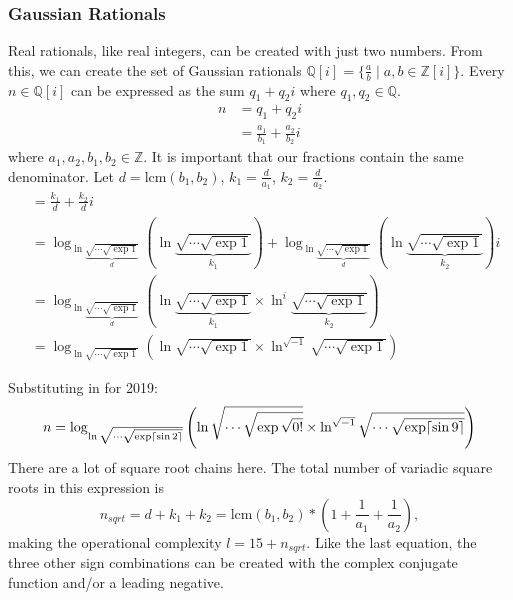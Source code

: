 \subsubsection{Gaussian Rationals}
Real rationals, like real integers, can be created with just two numbers.
From this, we can create the set of Gaussian rationals $\mathbb{Q}[i]=\{\frac{a}{b}\mid a,b\in\mathbb{Z}[i]\}$.
Every $n\in\mathbb{Q}[i]$ can be expressed as the sum $q_1+q_2i$ where $q_1,q_2\in\mathbb{Q}$.
\begin{align*}
  n &= q_1+q_2i \\
  &= \frac{a_1}{b_1} + \frac{a_2}{b_2}i
\end{align*}
where $a_1, a_2, b_1, b_2\in\mathbb{Z}$.
It is important that our fractions contain the same denominator.
Let $d=\textrm{lcm}(b_1, b_2)$, $k_1=\frac{d}{a_1}$, $k_2=\frac{d}{a_2}$.
\begin{align*}
  &= \frac{k_1}{d} + \frac{k_2}{d}i \\
  &= \log_{
      \ln \underbrace{\sqrt{\cdots\sqrt{\exp1}}}_{d}
    }
    \left(
      \ln \underbrace{\sqrt{\cdots\sqrt{\exp1}}}_{k_1}
    \right) +
    \log_{
      \ln \underbrace{\sqrt{\cdots\sqrt{\exp1}}}_{d}
    }
    \left(
      \ln \underbrace{\sqrt{\cdots\sqrt{\exp1}}}_{k_2}
    \right)i \\
  &= \log_{
      \ln \underbrace{\sqrt{\cdots\sqrt{\exp1}}}_{d}
    }
    \left(
      \ln \underbrace{\sqrt{\cdots\sqrt{\exp1}}}_{k_1}
      \times
      \ln^{i} \underbrace{\sqrt{\cdots\sqrt{\exp1}}}_{k_2}
    \right) \\
  &= \log_{\ln \sqrt{\cdots\sqrt{\exp1}}}
    \left(
      \ln \sqrt{\cdots\sqrt{\exp1}}
      \times
      \ln^{\sqrt{-1}} \sqrt{\cdots\sqrt{\exp1}}
    \right)
\end{align*}

Substituting in for 2019:
\begin{equation}
  n = \log_{\ln \sqrt{\cdots\sqrt{\exp\ceil{\sin2}}}}
    \left(
      \ln \sqrt{\cdots\sqrt{\exp\sqrt{0!}}}
      \times
      \ln^{\sqrt{-1}} \sqrt{\cdots\sqrt{\exp\ceil{\sin9}}}
    \right)
\end{equation}
There are a lot of square root chains here.
The total number of variadic square roots in this expression is
\begin{equation*}
  n_{sqrt}=d+k_1+k_2=\textrm{lcm}(b_1,b_2) * \left(1+\frac{1}{a_1}+\frac{1}{a_2}\right),
\end{equation*}
making the operational complexity $l=15+n_{sqrt}$.
Like the last equation, the three other sign combinations can be created with the complex conjugate function and/or a leading negative.
